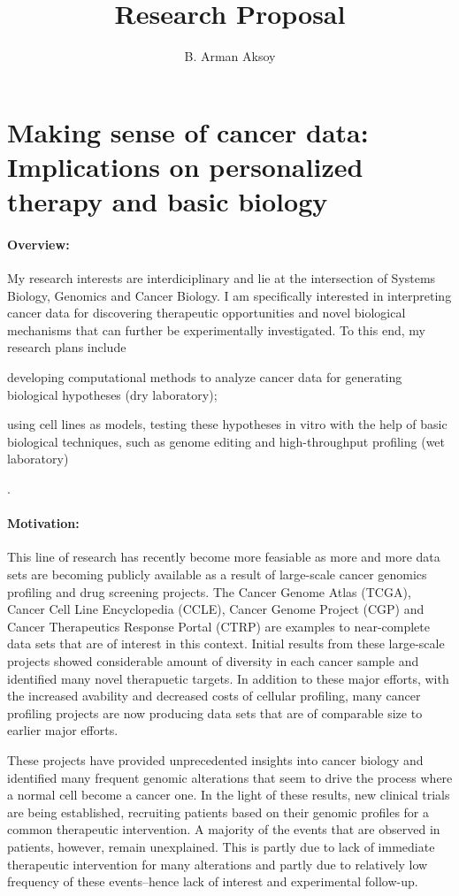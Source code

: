 \documentclass[11pt,letterpaper]{article}
\title{Research Proposal}
\author{B. Arman Aksoy}
\date{}
\begin{document}
\maketitle

\section*{Making sense of cancer data: Implications on personalized therapy and basic biology}
\paragraph{Overview:} My research interests are interdiciplinary and lie at the intersection of Systems Biology, Genomics and Cancer Biology.
I am specifically interested in interpreting cancer data for discovering therapeutic opportunities and novel biological mechanisms that can further be experimentally investigated.
To this end, my research plans include
\begin{inparaenum}[(i)]
 \item developing computational methods to analyze cancer data for generating biological hypotheses (dry laboratory);
 \item using cell lines as models, testing these hypotheses in vitro with the help of basic biological techniques, such as genome editing and high-throughput profiling (wet laboratory)
\end{inparaenum}.

\paragraph{Motivation:} This line of research has recently become more feasiable as more and more data sets are becoming publicly available as a result of large-scale cancer genomics profiling and drug screening projects. 
The Cancer Genome Atlas (TCGA), Cancer Cell Line Encyclopedia (CCLE), Cancer Genome Project (CGP) and Cancer Therapeutics Response Portal (CTRP) are examples to near-complete data sets that are of interest in this context.
Initial results from these large-scale projects showed considerable amount of diversity in each cancer sample
and identified many novel therapuetic targets.
In addition to these major efforts, with the increased avability and decreased costs of cellular profiling, many cancer profiling projects are now producing data sets that are of comparable size to earlier major efforts.

These projects have provided unprecedented insights into cancer biology
and identified many frequent genomic alterations that seem to drive the process where a normal cell become a cancer one.
In the light of these results, new clinical trials are being established, recruiting patients based on their genomic profiles for a common therapeutic intervention.
A majority of the events that are observed in patients, however, remain unexplained.
This is partly due to lack of immediate therapeutic intervention for many alterations
and partly due to relatively low frequency of these events--hence lack of interest and experimental follow-up.
\end{document}
